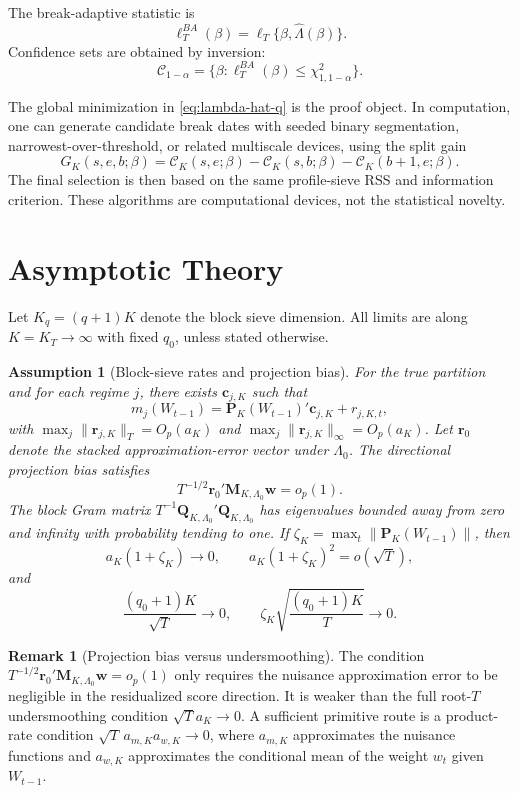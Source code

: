 \documentclass[12pt]{article} %
\numberwithin{equation}{section}
\newtheorem{assumption}{Assumption}
\theoremstyle{definition}
\newtheorem{remark}{Remark}
\begin{document}
The break-adaptive statistic is
\begin{equation}
    \ell_T^{BA}(\beta)
    =
    \ell_T\{\beta,\widehat\Lambda(\beta)\}.
    \label{eq:ba-stat}
\end{equation}
Confidence sets are obtained by inversion:
\[
    \mathcal C_{1-\alpha}
    =
    \{\beta:\ell_T^{BA}(\beta)\leq \chi^2_{1,1-\alpha}\}.
\]

The global minimization in \eqref{eq:lambda-hat-q} is the proof object. In computation, one can generate candidate break dates with seeded binary segmentation, narrowest-over-threshold, or related multiscale devices, using the split gain
\[
    G_K(s,e,b;\beta)
    =
    \mathcal C_K(s,e;\beta)
    -
    \mathcal C_K(s,b;\beta)
    -
    \mathcal C_K(b+1,e;\beta).
\]
The final selection is then based on the same profile-sieve RSS and information criterion. These algorithms are computational devices, not the statistical novelty.

\section{Asymptotic Theory}
\label{sec:theory}

Let \(K_q=(q+1)K\) denote the block sieve dimension. All limits are along \(K=K_T\to\infty\) with fixed \(q_0\), unless stated otherwise.

\begin{assumption}[Block-sieve rates and projection bias]
\label{ass:block-sieve}
For the true partition and for each regime \(j\), there exists \(\bm c_{j,K}\) such that
\[
    m_j(W_{t-1})
    =
    \bm P_K(W_{t-1})'\bm c_{j,K}
    +
    r_{j,K,t},
\]
with \(\max_j\|\bm r_{j,K}\|_T=O_p(a_K)\) and \(\max_j\|\bm r_{j,K}\|_\infty=O_p(a_K)\). Let \(\bm r_0\) denote the stacked approximation-error vector under \(\Lambda_0\). The directional projection bias satisfies
\[
    T^{-1/2}\bm r_0'\bm M_{K,\Lambda_0}\bm w=o_p(1).
\]
The block Gram matrix \(T^{-1}\bm Q_{K,\Lambda_0}'\bm Q_{K,\Lambda_0}\) has eigenvalues bounded away from zero and infinity with probability tending to one. If \(\zeta_K=\max_t\|\bm P_K(W_{t-1})\|\), then
\[
    a_K(1+\zeta_K)\to0,
    \qquad
    a_K(1+\zeta_K)^2=o(\sqrt T),
\]
and
\[
    \frac{(q_0+1)K}{\sqrt T}\to0,
    \qquad
    \zeta_K\sqrt{\frac{(q_0+1)K}{T}}\to0.
\]
\end{assumption}

\begin{remark}[Projection bias versus undersmoothing]
The condition \(T^{-1/2}\bm r_0'\bm M_{K,\Lambda_0}\bm w=o_p(1)\) only requires the nuisance approximation error to be negligible in the residualized score direction. It is weaker than the full root-\(T\) undersmoothing condition \(\sqrt T a_K\to0\). A sufficient primitive route is a product-rate condition \(\sqrt T\,a_{m,K}a_{w,K}\to0\), where \(a_{m,K}\) approximates the nuisance functions and \(a_{w,K}\) approximates the conditional mean of the weight \(w_t\) given \(W_{t-1}\).
\end{remark}
\end{document}
